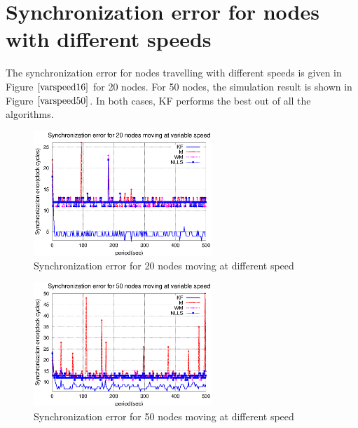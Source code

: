 \documentclass[a4paper,10pt]{report}
\begin{document}
\section{\textbf{Synchronization error for nodes with different speeds}}
The synchronization error for nodes travelling with different speeds is given in Figure $\ref{varspeed16}$ for 20 nodes. For 50 nodes, the simulation result is shown in Figure $\ref{varspeed50}$. In both cases, KF performs the best out of all the algorithms.
\begin{figure}
 \centering
 \includegraphics[width=0.6\textwidth]{varspeed20}
 \caption{Synchronization error for 20 nodes moving at different speed}
 \label{varspeed16}
\end{figure}
\begin{figure}
 \centering
 \includegraphics[width=0.6\textwidth]{varspeed50}
 \caption{Synchronization error for 50 nodes moving at different speed}
 \label{varspeed50}
\end{figure}
\end{document}
